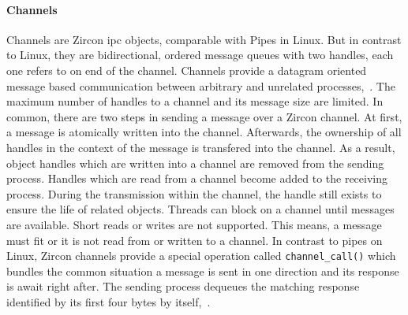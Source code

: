 %

\paragraph{Channels}
Channels are Zircon \ac{ipc} objects, comparable with Pipes in Linux.
But in contrast to Linux, they are bidirectional, ordered message queues with two handles, each one refers to on end of the channel.
Channels provide a datagram oriented message based communication between arbitrary and unrelated processes\cite{zircon-channel},~\cite{zircon-concepts}.
The maximum number of handles to a channel and its message size are limited.
In common, there are two steps in sending a message over a Zircon channel.
At first, a message is atomically written into the channel.
Afterwards, the ownership of all handles in the context of the message is transfered into the channel\cite{zircon-channel}.
As a result, object handles which are written into a channel are removed from the sending process.
Handles which are read from a channel become added to the receiving process.
During the transmission within the channel, the handle still exists to ensure the life of related objects\cite{zircon-concepts}.
Threads can block on a channel until messages are available.
Short reads or writes are not supported.
This means, a message must fit or it is not read from or written to a channel.
In contrast to pipes on Linux, Zircon channels provide a special operation called \texttt{channel\_call()} which bundles the common situation a message is sent in one direction and its response is await right after.
The sending process dequeues the matching response identified by its first four bytes by itself\cite{zircon-concepts},~\cite{zircon-channel}.


